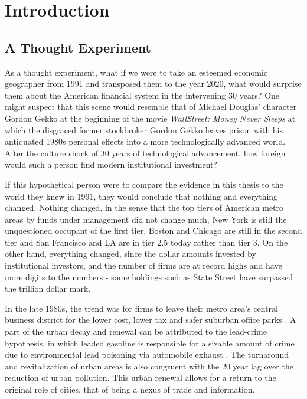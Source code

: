 \chapter{Introduction}
\label{ChapterI}

\section{A Thought Experiment}

As a thought experiment, what if we were to take an esteemed economic geographer from 1991 and transposed them to the year 2020, what would surprise them about the American financial system in the intervening 30 years?  One might suspect that this scene would resemble that of Michael Douglas' character Gordon Gekko at the beginning of the movie \textit{WallStreet: Money Never Sleeps} at which the disgraced former stockbroker Gordon Gekko leaves prison with his antiquated 1980s personal effects into a more technologically advanced world.  After the culture shock of 30 years of technological advancement, how foreign would such a person find modern institutional investment?  

If this hypothetical person were to compare the evidence in this thesis to the world they knew in 1991, they would conclude that nothing and everything changed.  Nothing changed, in the sense that the top tiers of American metro areas by funds under management did not change much, New York is still the unquestioned occupant of the first tier, Boston and Chicago are still in the second tier and San Francisco and LA are in tier 2.5 today rather than tier 3.  On the other hand, everything changed, since the dollar amounts invested by institutional investors, and the number of firms are at record highs and have more digits to the numbers - some holdings such as State Street have surpassed the trillion dollar mark.  

In the late 1980s, the trend was for firms to leave their metro area's central business district for the lower cost, lower tax and safer suburban office parks \citep{bodenmanfirm2000}.  A part of the urban decay and renewal can be attributed to the lead-crime hypothesis, in which leaded gasoline is responsible for a sizable amount of crime due to environmental lead poisoning via automobile exhaust \citep{feigenbaum2016lead,NBERw23392}.  The turnaround and revitalization of urban areas is also congruent with the 20 year lag over the reduction of urban pollution.  This urban renewal allows for a return to the original role of cities, that of being a nexus of trade and information. 

